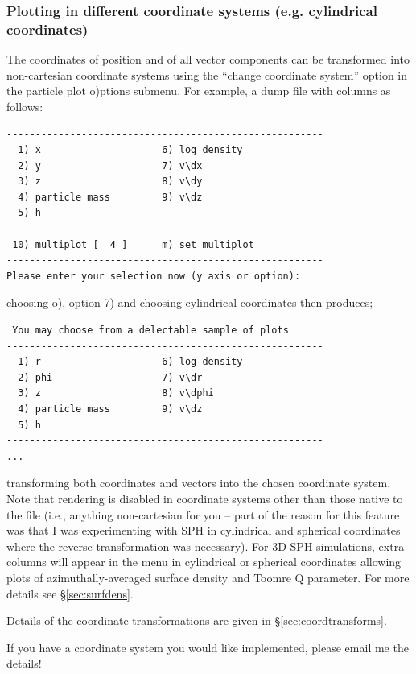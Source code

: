 \documentclass[a4paper,10pt]{article}
\begin{document}
\subsubsection{ Plotting in different coordinate systems (e.g. cylindrical coordinates)}
\label{sec:geom}
 The coordinates of position and of all vector components can be transformed into non-cartesian coordinate systems using the ``change coordinate system'' option in the particle plot o)ptions submenu. For example, a dump file with columns as follows:
\begin{verbatim}
-------------------------------------------------------
  1) x                     6) log density         
  2) y                     7) v\dx                
  3) z                     8) v\dy                
  4) particle mass         9) v\dz                
  5) h                   
-------------------------------------------------------
 10) multiplot [  4 ]      m) set multiplot 
-------------------------------------------------------
Please enter your selection now (y axis or option):
\end{verbatim}
choosing o), option 7) and choosing cylindrical coordinates then produces;
\begin{verbatim}
 You may choose from a delectable sample of plots 
-------------------------------------------------------
  1) r                     6) log density         
  2) phi                   7) v\dr                
  3) z                     8) v\dphi              
  4) particle mass         9) v\dz                
  5) h                   
-------------------------------------------------------
...
\end{verbatim}
transforming both coordinates and vectors into the chosen coordinate system. Note that rendering is disabled in coordinate systems other than those native to the file (i.e., anything non-cartesian for you -- part of the reason for this feature was that I was experimenting with SPH in cylindrical and spherical coordinates where the reverse transformation was necessary). 
 For 3D SPH simulations, extra columns will appear in the menu in cylindrical or spherical coordinates allowing plots of azimuthally-averaged surface density and Toomre Q parameter. For more details see \S\ref{sec:surfdens}.

 Details of the coordinate transformations are given in \S\ref{sec:coordtransforms}.

 If you have a coordinate system you would like implemented, please email me the details!
\end{document}
